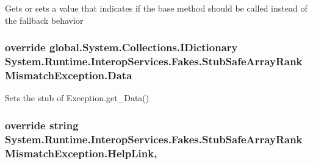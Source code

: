 Gets or sets a value that indicates if the base method should be called instead of the fallback behavior

\hypertarget{class_system_1_1_runtime_1_1_interop_services_1_1_fakes_1_1_stub_safe_array_rank_mismatch_exception_a00b260f8d1688de769b8c6fa7acd8e30}{
\subsubsection[{Data}]{\setlength{\rightskip}{0pt plus 5cm}override global.\-System.\-Collections.\-I\-Dictionary System.\-Runtime.\-Interop\-Services.\-Fakes.\-Stub\-Safe\-Array\-Rank\-Mismatch\-Exception.\-Data\hspace{0.3cm}{\ttfamily [get]}}}\label{class_system_1_1_runtime_1_1_interop_services_1_1_fakes_1_1_stub_safe_array_rank_mismatch_exception_a00b260f8d1688de769b8c6fa7acd8e30}


Sets the stub of Exception.\-get\-\_\-\-Data()

\hypertarget{class_system_1_1_runtime_1_1_interop_services_1_1_fakes_1_1_stub_safe_array_rank_mismatch_exception_ae8b5f1d582e1048f0a43e19a38dfe591}{
\subsubsection[{Help\-Link}]{\setlength{\rightskip}{0pt plus 5cm}override string System.\-Runtime.\-Interop\-Services.\-Fakes.\-Stub\-Safe\-Array\-Rank\-Mismatch\-Exception.\-Help\-Link\hspace{0.3cm}{\ttfamily [get]}, {\ttfamily [set]}}}\label{class_system_1_1_runtime_1_1_interop_services_1_1_fakes_1_1_stub_safe_array_rank_mismatch_exception_ae8b5f1d582e1048f0a43e19a38dfe591}


